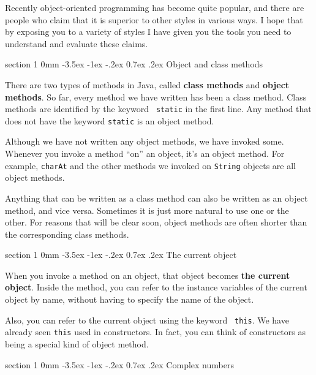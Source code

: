 \documentclass{book}
\makeatletter
\renewcommand{\section}{\@startsection 
    {section} {1} {0mm}%
    {-3.5ex \@plus -1ex \@minus -.2ex}%
    {0.7ex \@plus.2ex}%
    {\normalfont\Large\bfseries}}
\makeatother
\begin{document}

Recently object-oriented programming has become quite popular, and
there are people who claim that it is superior to other styles in
various ways.  I hope that by exposing you to a variety of styles I
have given you the tools you need to understand and evaluate these
claims.


\section{Object and class methods}

There are two types of methods in Java, called {\bf class methods} and
{\bf object methods}.  So far, every method we have written has been a
class method.  Class methods are identified by the keyword {\tt
static} in the first line.  Any method that does not have the keyword
{\tt static} is an object method.

Although we have not written any object methods, we have invoked some.
Whenever you invoke a method ``on'' an object, it's an object method.
For example, {\tt charAt} and the other methods we invoked on {\tt String}
objects are all object methods.

Anything that can be written as a class method can also be written as an
object method, and vice versa.  Sometimes it is just more natural to
use one or the other.  For reasons that will be clear soon, object
methods are often shorter than the corresponding class methods.


\section{The current object}

When you invoke a method on an object, that object becomes {\bf the
current object}.  Inside the method, you can refer to the instance
variables of the current object by name, without having to specify the
name of the object.


Also, you can refer to the current object using the keyword {\tt
this}.  We have already seen {\tt this} used in constructors.  In
fact, you can think of constructors as being a special kind of object
method.


\section{Complex numbers}
\end{document}
